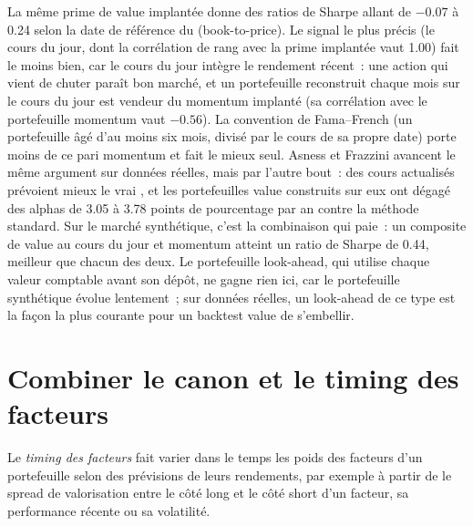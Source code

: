 La même prime de value implantée donne des ratios de Sharpe allant de $-0.07$ à 0.24 selon la date de référence du  (book-to-price). Le signal le plus précis (le cours du jour,
dont la corrélation de rang avec la prime implantée vaut 1.00) fait le moins bien, car le cours du jour intègre le rendement récent~: une action qui vient de chuter paraît
bon marché, et un portefeuille reconstruit chaque mois sur le cours du jour est vendeur du momentum implanté (sa corrélation avec le portefeuille momentum vaut $-0.56$). La convention de Fama--French
(un portefeuille âgé d'au moins six mois, divisé par le cours de sa propre date) porte moins de ce pari momentum et fait le mieux seul. Asness et Frazzini avancent le même
argument sur données réelles, mais par l'autre bout~: des cours actualisés prévoient mieux le vrai , et les portefeuilles value construits sur eux ont dégagé des alphas de 3.05 à 3.78
points de pourcentage par an contre la méthode standard. Sur le marché synthétique, c'est la combinaison qui paie~: un composite de
value au cours du jour et momentum atteint un ratio de Sharpe de 0.44, meilleur que chacun des deux. Le portefeuille look-ahead, qui utilise chaque valeur comptable avant son dépôt, ne gagne
rien ici, car le portefeuille synthétique évolue lentement~; sur données réelles, un look-ahead de ce type est la façon la plus courante pour un backtest value de s'embellir.

\section{Combiner le canon et le timing des facteurs}

\begin{definition}\label{def:s1:value-quality-and-low-risk:timing}
Le \emph{timing des facteurs} fait varier dans le temps les poids des facteurs d'un portefeuille selon des prévisions de leurs rendements, par exemple à partir de
le spread de valorisation entre le côté long et le côté short d'un facteur, sa performance récente ou sa volatilité.
\end{definition}

